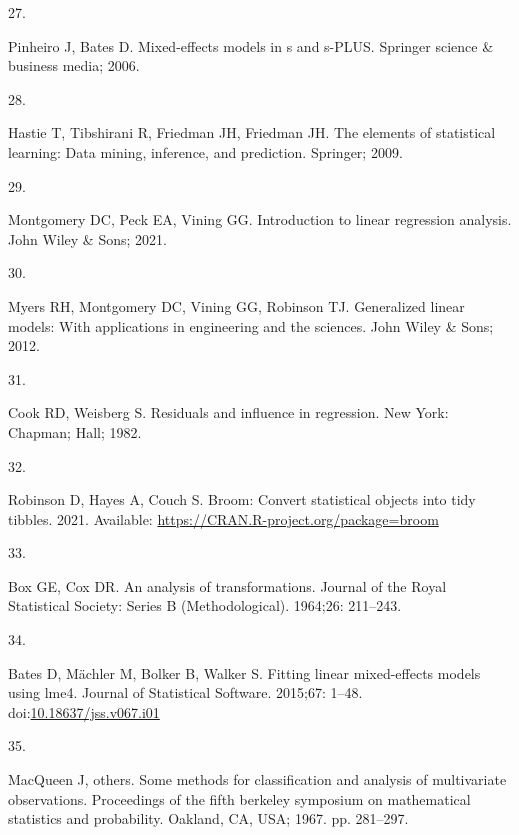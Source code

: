 \documentclass[10pt,letterpaper]{article}
\newlength{\cslhangindent}
\newlength{\csllabelwidth}
\newlength{\cslentryspacingunit} %
\newenvironment{CSLReferences}[2] %
 {%
  \setlength{\parindent}{0pt}
  \ifodd #1
  \let\oldpar\par
  \def\par{\hangindent=\cslhangindent\oldpar}
  \fi
  \setlength{\parskip}{#2\cslentryspacingunit}
 }%
 {}
\newcommand{\CSLLeftMargin}[1]{\parbox[t]{\csllabelwidth}{#1}}
\newcommand{\CSLRightInline}[1]{\parbox[t]{\linewidth - \csllabelwidth}{#1}\break}
\begin{document}
\begin{CSLReferences}{0}{0}
\leavevmode\hypertarget{ref-pinheiro2006mixed}{}%
\CSLLeftMargin{27. }
\CSLRightInline{Pinheiro J, Bates D. Mixed-effects models in s and
s-PLUS. Springer science \& business media; 2006. }

\leavevmode\hypertarget{ref-hastie2009elements}{}%
\CSLLeftMargin{28. }
\CSLRightInline{Hastie T, Tibshirani R, Friedman JH, Friedman JH. The
elements of statistical learning: Data mining, inference, and
prediction. Springer; 2009. }

\leavevmode\hypertarget{ref-montgomery2021introduction}{}%
\CSLLeftMargin{29. }
\CSLRightInline{Montgomery DC, Peck EA, Vining GG. Introduction to
linear regression analysis. John Wiley \& Sons; 2021. }

\leavevmode\hypertarget{ref-myers2012generalized}{}%
\CSLLeftMargin{30. }
\CSLRightInline{Myers RH, Montgomery DC, Vining GG, Robinson TJ.
Generalized linear models: With applications in engineering and the
sciences. John Wiley \& Sons; 2012. }

\leavevmode\hypertarget{ref-cook1982residuals}{}%
\CSLLeftMargin{31. }
\CSLRightInline{Cook RD, Weisberg S. Residuals and influence in
regression. New York: Chapman; Hall; 1982. }

\leavevmode\hypertarget{ref-robinson2021broom}{}%
\CSLLeftMargin{32. }
\CSLRightInline{Robinson D, Hayes A, Couch S. Broom: Convert statistical
objects into tidy tibbles. 2021. Available:
\url{https://CRAN.R-project.org/package=broom}}

\leavevmode\hypertarget{ref-box1964analysis}{}%
\CSLLeftMargin{33. }
\CSLRightInline{Box GE, Cox DR. An analysis of transformations. Journal
of the Royal Statistical Society: Series B (Methodological). 1964;26:
211--243. }

\leavevmode\hypertarget{ref-bates2015lme4}{}%
\CSLLeftMargin{34. }
\CSLRightInline{Bates D, Mächler M, Bolker B, Walker S. Fitting linear
mixed-effects models using {lme4}. Journal of Statistical Software.
2015;67: 1--48.
doi:\href{https://doi.org/10.18637/jss.v067.i01}{10.18637/jss.v067.i01}}

\leavevmode\hypertarget{ref-macqueen1967some}{}%
\CSLLeftMargin{35. }
\CSLRightInline{MacQueen J, others. Some methods for classification and
analysis of multivariate observations. Proceedings of the fifth berkeley
symposium on mathematical statistics and probability. Oakland, CA, USA;
1967. pp. 281--297. }

\end{CSLReferences}

\nolinenumbers
\end{document}

